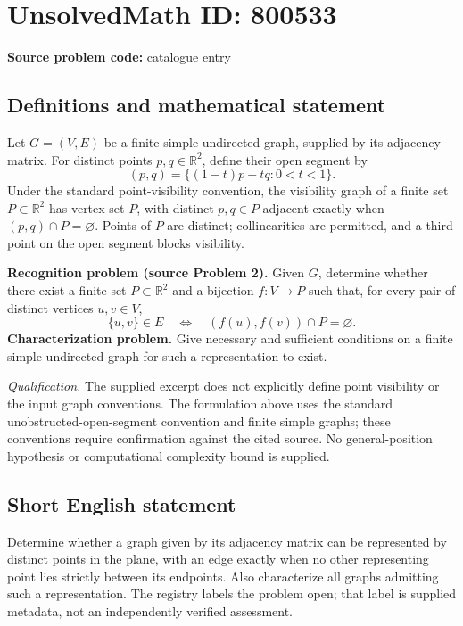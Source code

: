 \documentclass[11pt]{article}
\newcommand{\R}{\mathbb{R}}
\begin{document}
\section*{UnsolvedMath ID: 800533}
\textbf{Source problem code:} catalogue entry
\subsection{Definitions and mathematical statement}
Let \(G=(V,E)\) be a finite simple undirected graph, supplied by its adjacency matrix. For distinct points \(p,q\in\R^2\), define their open segment by
\[
(p,q)=\{(1-t)p+tq:0<t<1\}.
\]
Under the standard point-visibility convention, the visibility graph of a finite set \(P\subset\R^2\) has vertex set \(P\), with distinct \(p,q\in P\) adjacent exactly when \((p,q)\cap P=\varnothing\). Points of \(P\) are distinct; collinearities are permitted, and a third point on the open segment blocks visibility.

\textbf{Recognition problem (source Problem 2).} Given \(G\), determine whether there exist a finite set \(P\subset\R^2\) and a bijection \(f:V\to P\) such that, for every pair of distinct vertices \(u,v\in V\),
\[
\{u,v\}\in E
\quad\Longleftrightarrow\quad
(f(u),f(v))\cap P=\varnothing.
\]
\textbf{Characterization problem.} Give necessary and sufficient conditions on a finite simple undirected graph for such a representation to exist.

\textit{Qualification.} The supplied excerpt does not explicitly define point visibility or the input graph conventions. The formulation above uses the standard unobstructed-open-segment convention and finite simple graphs; these conventions require confirmation against the cited source. No general-position hypothesis or computational complexity bound is supplied.
\subsection{Short English statement}
Determine whether a graph given by its adjacency matrix can be represented by distinct points in the plane, with an edge exactly when no other representing point lies strictly between its endpoints. Also characterize all graphs admitting such a representation. The registry labels the problem open; that label is supplied metadata, not an independently verified assessment.
\end{document}
